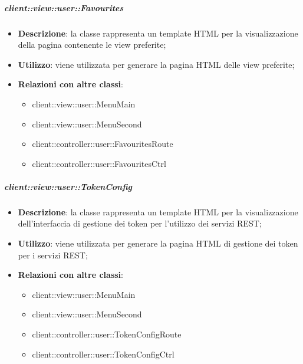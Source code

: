 		\subparagraph{client::view::user::Favourites} %
		\label{subp:bdsm_app_client_view_user_favourites}
			\begin{itemize}
				\item \textbf{Descrizione}: la classe rappresenta un template HTML per la visualizzazione della pagina contenente le view preferite;
				\item \textbf{Utilizzo}: viene utilizzata per generare la pagina HTML delle view preferite;
				\item \textbf{Relazioni con altre classi}:
					\begin{itemize}
						\item client::view::user::MenuMain
						\item client::view::user::MenuSecond
						\item client::controller::user::FavouritesRoute
						\item client::controller::user::FavouritesCtrl
					\end{itemize}
			\end{itemize}

		\subparagraph{client::view::user::TokenConfig} %
		\label{subp:bdsm_app_client_view_user_tokenconfig}
			\begin{itemize}
				\item \textbf{Descrizione}: la classe rappresenta un template HTML per la visualizzazione dell'interfaccia di gestione dei token per l'utilizzo dei servizi REST;
				\item \textbf{Utilizzo}: viene utilizzata per generare la pagina HTML di gestione dei token per i servizi REST;
				\item \textbf{Relazioni con altre classi}:
					\begin{itemize}
						\item client::view::user::MenuMain
						\item client::view::user::MenuSecond
						\item client::controller::user::TokenConfigRoute
						\item client::controller::user::TokenConfigCtrl
					\end{itemize}
			\end{itemize}

